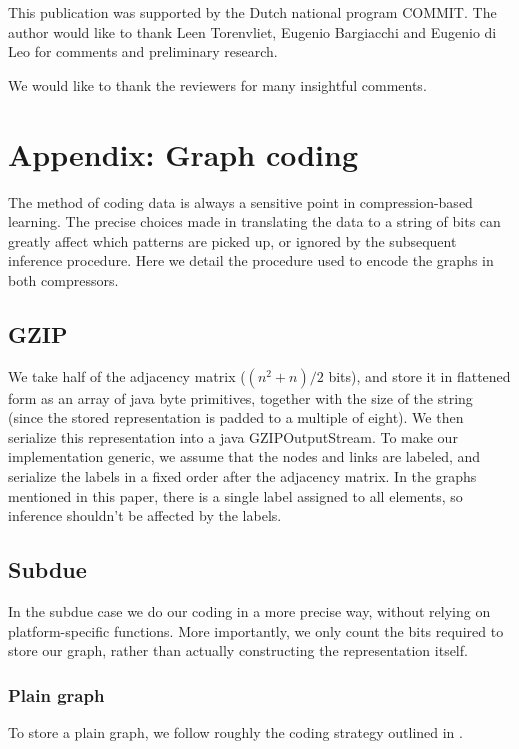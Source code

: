 \documentclass{article}
\begin{document}
This publication was supported by the Dutch national program COMMIT. The author would like to thank Leen Torenvliet, Eugenio Bargiacchi and Eugenio di Leo for comments and preliminary research.

We would like to thank the reviewers for many insightful comments.

\appendix

\section*{Appendix: Graph coding}

The method of coding data is always a sensitive point in compression-based learning. The precise choices made in translating the data to a string of bits can greatly affect which patterns are picked up, or ignored by the subsequent inference procedure. Here we detail the procedure used to encode the graphs in both compressors.

\subsection*{GZIP}
We take half of the adjacency matrix ($(n^2 + n)/2$ bits), and store it in flattened form as an array of java byte primitives, together with the size of the string (since the stored representation is padded to a multiple of eight). We then serialize this representation into a java GZIPOutputStream. To make our implementation generic, we assume that the nodes and links are labeled, and serialize the labels in a fixed order after the adjacency matrix. In the graphs mentioned in this paper, there is a single label assigned to all elements, so inference shouldn't be affected by the labels.

\subsection*{Subdue}

In the subdue case we do our coding in a more precise way, without relying on platform-specific functions. More importantly, we only count the bits required to store our graph, rather than actually constructing the representation itself.

\subsubsection*{Plain graph}

To store a plain graph, we follow roughly the coding strategy outlined in . 
\end{document}
